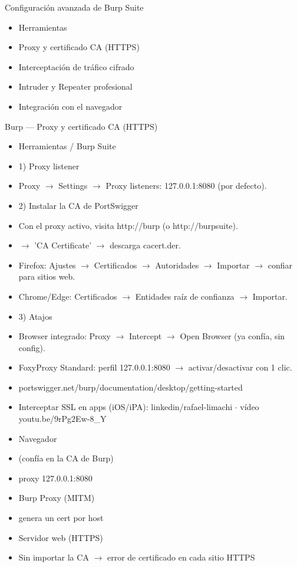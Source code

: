 \documentclass[aspectratio=169,10pt]{beamer}
\begin{document}
\begin{frame}[allowframebreaks]{Configuración avanzada de Burp Suite}
\small
  \begin{itemize}
  \item Herramientas
  \item Proxy y certificado CA (HTTPS)
  \item Interceptación de tráfico cifrado
  \item Intruder y Repeater profesional
  \item Integración con el navegador
  \end{itemize}
\end{frame}

\begin{frame}[allowframebreaks]{Burp --- Proxy y certificado CA (HTTPS)}
\small
  \begin{itemize}
  \item Herramientas / Burp Suite
  \item 1) Proxy listener
  \item Proxy $\rightarrow$ Settings $\rightarrow$ Proxy listeners: 127.0.0.1:8080 (por defecto).
  \item 2) Instalar la CA de PortSwigger
  \item Con el proxy activo, visita http://burp (o http://burpsuite).
  \item $\rightarrow$ 'CA Certificate' $\rightarrow$ descarga cacert.der.
  \item Firefox: Ajustes $\rightarrow$ Certificados $\rightarrow$ Autoridades $\rightarrow$ Importar $\rightarrow$ confiar para sitios web.
  \item Chrome/Edge: Certificados $\rightarrow$ Entidades raíz de confianza $\rightarrow$ Importar.
  \item 3) Atajos
  \item Browser integrado: Proxy $\rightarrow$ Intercept $\rightarrow$ Open Browser (ya confía, sin config).
  \item FoxyProxy Standard: perfil 127.0.0.1:8080 $\rightarrow$ activar/desactivar con 1 clic.
  \item portswigger.net/burp/documentation/desktop/getting-started
  \item Interceptar SSL en apps (iOS/iPA): linkedin/rafael-limachi $\cdot$ vídeo youtu.be/9rPg2Ew-8\_Y
  \item Navegador
  \item (confía en la CA de Burp)
  \item proxy 127.0.0.1:8080
  \item Burp Proxy (MITM)
  \item genera un cert por host
  \item Servidor web (HTTPS)
  \item Sin importar la CA $\rightarrow$ error de certificado en cada sitio HTTPS
  \end{itemize}
\end{frame}
\end{document}
